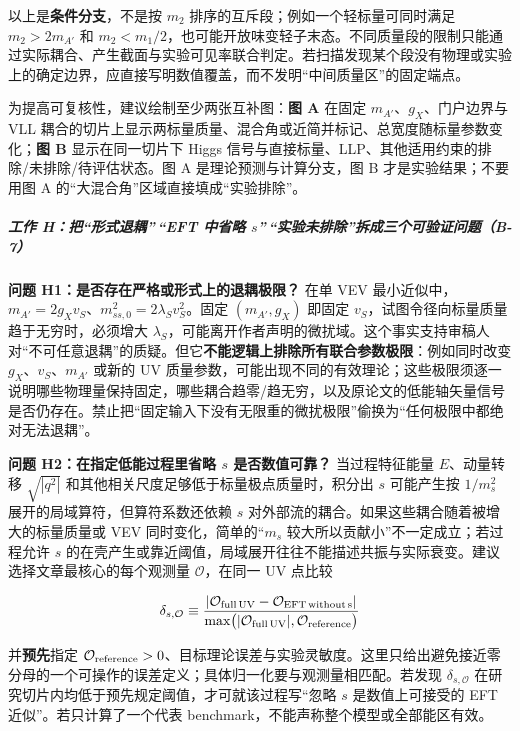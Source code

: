 \documentclass[
  chinese,
  UTF8]{ctexart}
\begin{document}
以上是\textbf{条件分支}，不是按 \(m_2\)
排序的互斥段；例如一个轻标量可同时满足 \(m_2>2m_{A'}\) 和
\(m_2<m_1/2\)，也可能开放味变轻子末态。不同质量段的限制只能通过实际耦合、产生截面与实验可见率联合判定。若扫描发现某个段没有物理或实验上的确定边界，应直接写明数值覆盖，而不发明``中间质量区''的固定端点。

为提高可复核性，建议绘制至少两张互补图：\textbf{图 A} 在固定
\(m_{A'}\)、\(g_X\)、门户边界与 VLL
耦合的切片上显示两标量质量、混合角或近简并标记、总宽度随标量参数变化；\textbf{图
B} 显示在同一切片下 Higgs
信号与直接标量、LLP、其他适用约束的排除/未排除/待评估状态。图 A
是理论预测与计算分支，图 B 才是实验结果；不要用图 A
的``大混合角''区域直接填成``实验排除''。

\subparagraph{\texorpdfstring{工作 H：把``形式退耦''\,``EFT 中省略
\(s\)''\,``实验未排除''拆成三个可验证问题（B-7）}{工作 H：把``形式退耦''\,``EFT 中省略 s''\,``实验未排除''拆成三个可验证问题（B-7）}}\label{ux5de5ux4f5c-hux628aux5f62ux5f0fux9000ux8026eft-ux4e2dux7701ux7565-sux5b9eux9a8cux672aux6392ux9664ux62c6ux6210ux4e09ux4e2aux53efux9a8cux8bc1ux95eeux9898b-7}

\textbf{问题 H1：是否存在严格或形式上的退耦极限？} 在单 VEV
最小近似中，\(m_{A'}=2g_Xv_S\)、\(m_{ss,0}^2=2\lambda_Sv_S^2\)。固定
\((m_{A'},g_X)\) 即固定 \(v_S\)，试图令径向标量质量趋于无穷时，必须增大
\(\lambda_S\)，可能离开作者声明的微扰域。这个事实支持审稿人对``不可任意退耦''的质疑。但它\textbf{不能逻辑上排除所有联合参数极限}：例如同时改变
\(g_X\)、\(v_S\)、\(m_{A'}\) 或新的 UV
质量参数，可能出现不同的有效理论；这些极限须逐一说明哪些物理量保持固定，哪些耦合趋零/趋无穷，以及原论文的低能轴矢量信号是否仍存在。禁止把``固定输入下没有无限重的微扰极限''偷换为``任何极限中都绝对无法退耦''。

\textbf{问题 H2：在指定低能过程里省略 \(s\) 是否数值可靠？}
当过程特征能量 \(E\)、动量转移 \(\sqrt{|q^2|}\)
和其他相关尺度足够低于标量极点质量时，积分出 \(s\) 可能产生按
\(1/m_s^2\) 展开的局域算符，但算符系数还依赖 \(s\)
对外部流的耦合。如果这些耦合随着被增大的标量质量或 VEV
同时变化，简单的``\(m_s\) 较大所以贡献小''不一定成立；若过程允许 \(s\)
的在壳产生或靠近阈值，局域展开往往不能描述共振与实际衰变。建议选择文章最核心的每个观测量
\(\mathcal O\)，在同一 UV 点比较

\[
 \delta_{s,\mathcal O}\equiv
 \frac{|\mathcal O_{\rm full\,UV}-\mathcal O_{\rm EFT\,without\,s}|}
 {\max\bigl(|\mathcal O_{\rm full\,UV}|,\mathcal O_{\rm reference}\bigr)}
\]

并\textbf{预先}指定
\(\mathcal O_{\rm reference}>0\)、目标理论误差与实验灵敏度。这里只给出避免接近零分母的一个可操作的误差定义；具体归一化要与观测量相匹配。若发现
\(\delta_{s,\mathcal O}\)
在研究切片内均低于预先规定阈值，才可就该过程写``忽略 \(s\)
是数值上可接受的 EFT 近似''。若只计算了一个代表
benchmark，不能声称整个模型或全部能区有效。
\end{document}
